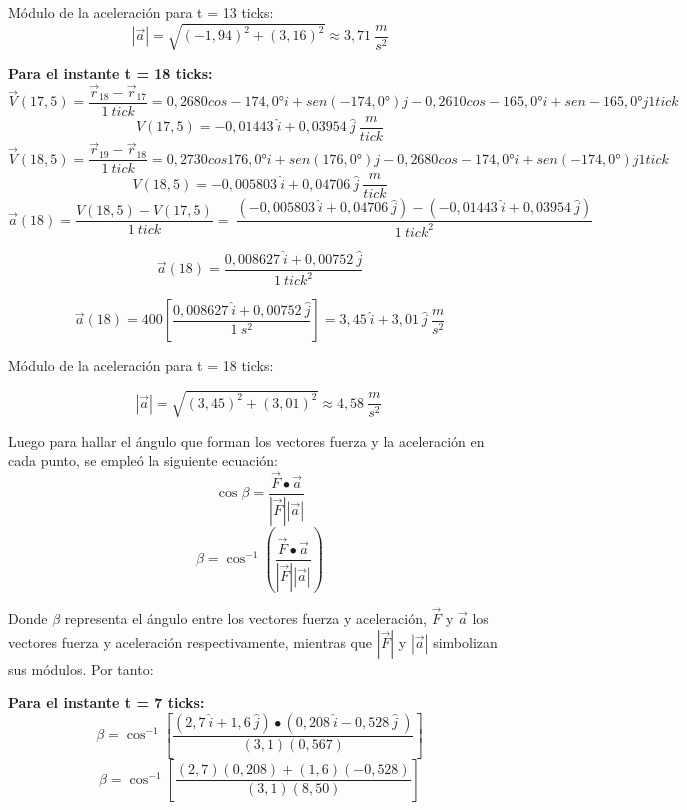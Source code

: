 \documentclass[../main.tex]{subfiles}
\begin{document}
Módulo de la aceleración para t = 13 ticks:
\[\left|\vec{a}\right|=\sqrt{\left(-1,94\right)^2+\left(3,16\right)^2}\approx3,71\ \frac{m}{s^2}\]

\textbf{Para el instante t = 18 ticks:}
\[\vec{V}\left(17,5\right)=\frac{{\vec{r}}_{18}-{\vec{r}}_{17}}{1\ tick}=0,2680cos-174,0°i+sen(-174,0°)j-0,2610cos-165,0°i+sen-165,0° j1 tick\]
\[V\left(17,5\right)=-0,01443\ \hat{i}+0,03954\ \hat{j}\ \frac{m}{tick}\]
\[\vec{V}\left(18,5\right)=\frac{{\vec{r}}_{19}-{\vec{r}}_{18}}{1\ tick}=0,2730cos176,0°i+sen(176,0°)j-0,2680cos-174,0°i+sen(-174,0°)j1 tick\]
\[V\left(18,5\right)=-0,005803\ \hat{i}+0,04706\ \hat{j}\ \frac{m}{tick}\]
\[\vec{a}\left(18\right)=\frac{V\left(18,5\right)-V\left(17,5\right)}{1\ tick}=\ \frac{\left(-0,005803\ \hat{i}+0,04706\ \hat{j}\right)-\left(-0,01443\ \hat{i}+0,03954\ \hat{j}\right)}{1\ {tick}^2}\]

\[\vec{a}\left(18\right)=\frac{0,008627\ \hat{i}+0,00752\ \hat{j}}{1\ {tick}^2}\]

\[\vec{a}\left(18\right)=400\left[\frac{0,008627\ \hat{i}+0,00752\ \hat{j}}{1\ s^2}\right]=3,45\ \hat{i}+3,01\ \hat{j}\ \frac{m}{s^2}\]

Módulo de la aceleración para t = 18 ticks:

\[\left|\vec{a}\right|=\sqrt{\left(3,45\right)^2+\left(3,01\right)^2}\approx4,58\ \frac{m}{s^2}\ \]

Luego para hallar el ángulo que forman los vectores fuerza y la aceleración en cada punto, se empleó la siguiente ecuación:
\[ \cos{\beta}=\frac{\vec{F}\bullet\vec{a}}{\left|\vec{F}\right|\left|\vec{a}\right|} \]
\[ \beta=\cos^{-1}{\left(\frac{\vec{F}\bullet\vec{a}}{\left|\vec{F}\right|\left|\vec{a}\right|}\right)} \]

Donde $\beta$ representa el ángulo entre los vectores fuerza y aceleración, $\vec{F}$ y $\vec{a}$ los vectores
fuerza y aceleración respectivamente, mientras que $\left|\vec{F}\right|$ y $\left|\vec{a}\right|$ simbolizan 
sus módulos. Por tanto:

\textbf{Para el instante t = 7 ticks:}
\[\beta=\cos^{-1}{\left[\frac{\left(2,7\ \hat{i}+1,6\ \hat{j}\right)\bullet\left(0,208\ \hat{i}-0,528\ \hat{j}\ \right)}{\left(3,1\right)\left(0,567\right)}\right]}\]
\[\beta=\cos^{-1}{\left[\frac{\left(2,7\right)\left(0,208\right)+\left(1,6\right)\left(-0,528\right)}{\left(3,1\right)\left(8,50\right)}\right]}\]
\end{document}

